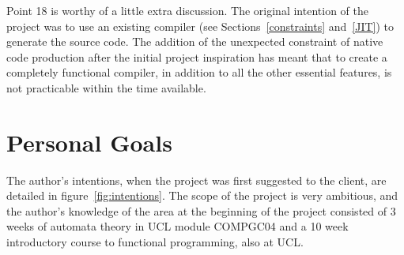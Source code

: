 \documentclass[12pt, a4paper]{report}
\begin{document}
Point 18 is worthy of a little extra discussion. The original intention of the project was to use
an existing compiler (see Sections~\ref{constraints} and~\ref{JIT}) to generate the source code.
The addition of the unexpected constraint of native code production after the initial project
inspiration has meant that to create a completely functional compiler, in addition to all the other
essential features, is not practicable within the time available.

\section{Personal Goals}
\label{personal}
The author's intentions, when the project was first suggested to the client, are detailed in
figure~\ref{fig:intentions}. The scope of the project is very ambitious, and the author's knowledge
of the area at the beginning of the project consisted of 3 weeks of automata theory in UCL module
COMPGC04 and a 10 week introductory course to functional programming, also at UCL. 
\end{document}
